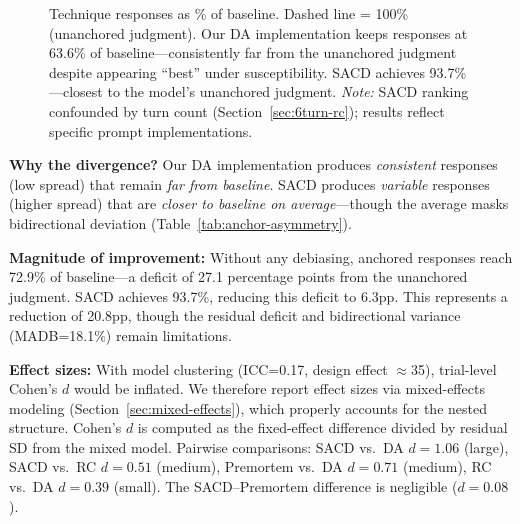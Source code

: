 \documentclass[11pt]{article}
\begin{document}
\begin{figure}[t]
\centering
{}
\caption{Technique responses as \% of baseline. Dashed line = 100\% (unanchored judgment). Our DA implementation keeps responses at 63.6\% of baseline---consistently far from the unanchored judgment despite appearing ``best'' under susceptibility. SACD achieves 93.7\%---closest to the model's unanchored judgment. \textit{Note:} SACD ranking confounded by turn count (Section~\ref{sec:6turn-rc}); results reflect specific prompt implementations.}
\label{fig:metric-comparison}
\end{figure}

\textbf{Why the divergence?} Our DA implementation produces \textit{consistent} responses (low spread) that remain \textit{far from baseline}. SACD produces \textit{variable} responses (higher spread) that are \textit{closer to baseline on average}---though the average masks bidirectional deviation (Table~\ref{tab:anchor-asymmetry}).

\textbf{Magnitude of improvement:} Without any debiasing, anchored responses reach 72.9\% of baseline---a deficit of 27.1 percentage points from the unanchored judgment. SACD achieves 93.7\%, reducing this deficit to 6.3pp. This represents a reduction of 20.8pp, though the residual deficit and bidirectional variance (MADB=18.1\%) remain limitations.

\textbf{Effect sizes:} With model clustering (ICC=0.17, design effect $\approx$35), trial-level Cohen's $d$ would be inflated. We therefore report effect sizes via mixed-effects modeling (Section~\ref{sec:mixed-effects}), which properly accounts for the nested structure. Cohen's $d$ is computed as the fixed-effect difference divided by residual SD from the mixed model. Pairwise comparisons: SACD vs.\ DA $d = 1.06$ (large), SACD vs.\ RC $d = 0.51$ (medium), Premortem vs.\ DA $d = 0.71$ (medium), RC vs.\ DA $d = 0.39$ (small). The SACD--Premortem difference is negligible ($d = 0.08$).
\end{document}
